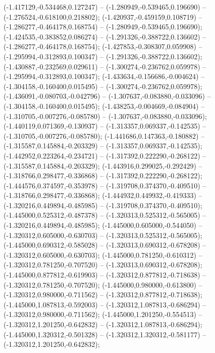  (-1.417129,-0.534468,0.127247) -- (-1.280949,-0.539465,0.196690) -- (-1.276524,-0.618100,0.218802);
 (-1.420937,-0.459159,0.108719) -- (-1.286277,-0.464178,0.168754) -- (-1.280949,-0.539465,0.196690);
 (-1.424535,-0.383852,0.086274) -- (-1.291326,-0.388722,0.136602) -- (-1.286277,-0.464178,0.168754);
 (-1.427853,-0.308307,0.059908) -- (-1.295994,-0.312893,0.100347) -- (-1.291326,-0.388722,0.136602);
 (-1.430887,-0.232569,0.029611) -- (-1.300274,-0.236762,0.059978) -- (-1.295994,-0.312893,0.100347);
 (-1.433634,-0.156686,-0.004624) -- (-1.304158,-0.160400,0.015495) -- (-1.300274,-0.236762,0.059978);
 (-1.436091,-0.080703,-0.042796) -- (-1.307637,-0.083880,-0.033096) -- (-1.304158,-0.160400,0.015495);
 (-1.438253,-0.004669,-0.084904) -- (-1.310705,-0.007276,-0.085780) -- (-1.307637,-0.083880,-0.033096);
 (-1.440119,0.071369,-0.130937) -- (-1.313357,0.069337,-0.142535) -- (-1.310705,-0.007276,-0.085780);
 (-1.441686,0.147363,-0.180882) -- (-1.315587,0.145884,-0.203329) -- (-1.313357,0.069337,-0.142535);
 (-1.442952,0.223264,-0.234721) -- (-1.317392,0.222290,-0.268122) -- (-1.315587,0.145884,-0.203329);
 (-1.443916,0.299025,-0.292429) -- (-1.318766,0.298477,-0.336868) -- (-1.317392,0.222290,-0.268122);
 (-1.444576,0.374597,-0.353978) -- (-1.319708,0.374370,-0.409510) -- (-1.318766,0.298477,-0.336868);
 (-1.444932,0.449932,-0.419333) -- (-1.320216,0.449894,-0.485985) -- (-1.319708,0.374370,-0.409510);
 (-1.445000,0.525312,-0.487378) -- (-1.320313,0.525312,-0.565005) -- (-1.320216,0.449894,-0.485985);
 (-1.445000,0.605000,-0.544050) -- (-1.320312,0.605000,-0.630703) -- (-1.320313,0.525312,-0.565005);
 (-1.445000,0.690312,-0.585028) -- (-1.320313,0.690312,-0.678208) -- (-1.320312,0.605000,-0.630703);
 (-1.445000,0.781250,-0.610312) -- (-1.320312,0.781250,-0.707520) -- (-1.320313,0.690312,-0.678208);
 (-1.445000,0.877812,-0.619903) -- (-1.320312,0.877812,-0.718638) -- (-1.320312,0.781250,-0.707520);
 (-1.445000,0.980000,-0.613800) -- (-1.320312,0.980000,-0.711562) -- (-1.320312,0.877812,-0.718638);
 (-1.445000,1.087813,-0.592003) -- (-1.320312,1.087813,-0.686294) -- (-1.320312,0.980000,-0.711562);
 (-1.445000,1.201250,-0.554513) -- (-1.320312,1.201250,-0.642832) -- (-1.320312,1.087813,-0.686294);
 (-1.445000,1.320312,-0.501328) -- (-1.320312,1.320312,-0.581177) -- (-1.320312,1.201250,-0.642832);
